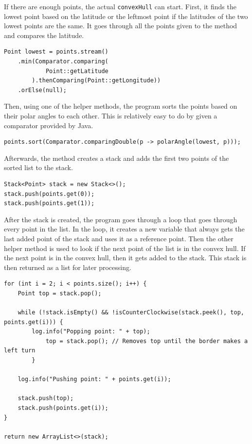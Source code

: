     If there are enough points, the actual \texttt{convexHull} can start. First, it finds the lowest point based on the latitude or the leftmost point if the latitudes of the two lowest points are the same. It goes through all the points given to the method and compares the latitude.
    \lstset{style=java, caption=Lowest Point Calculation}
    \begin{verbatim}
Point lowest = points.stream()
    .min(Comparator.comparing(
            Point::getLatitude
        ).thenComparing(Point::getLongitude))
    .orElse(null);
    \end{verbatim}

    Then, using one of the helper methods, the program sorts the points based on their polar angles to each other. This is relatively easy to do by given a comparator provided by Java.

    \lstset{style=java, caption=Sort Points Based on Polar Angle}
    \begin{verbatim}
points.sort(Comparator.comparingDouble(p -> polarAngle(lowest, p)));
    \end{verbatim}

    Afterwards, the method creates a stack and adds the first two points of the sorted list to the stack. 
    \lstset{style=java, caption=Create Stack}
    \begin{verbatim}
Stack<Point> stack = new Stack<>();
stack.push(points.get(0));
stack.push(points.get(1));
    \end{verbatim}

    After the stack is created, the program goes through a loop that goes through every point in the list. In the loop, it creates a new variable that always gets the last added point of the stack and uses it as a reference point. Then the other helper method is used to look if the next point of the list is in the convex hull. If the next point is in the convex hull, then it gets added to the stack. This stack is then returned as a list for later processing.
    \lstset{style=java, caption=Convex Hull Calculation}
    \begin{verbatim}
for (int i = 2; i < points.size(); i++) {
    Point top = stack.pop();

    while (!stack.isEmpty() && !isCounterClockwise(stack.peek(), top, points.get(i))) {
        log.info("Popping point: " + top);
            top = stack.pop(); // Removes top until the border makes a left turn
        }

    log.info("Pushing point: " + points.get(i));

    stack.push(top);
    stack.push(points.get(i));
}

return new ArrayList<>(stack);
    \end{verbatim}

